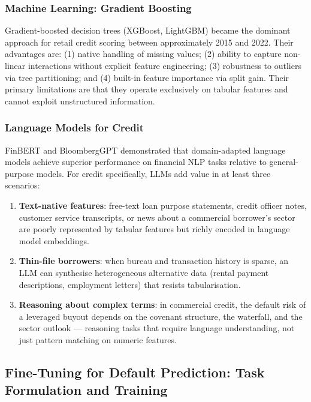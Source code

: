 \begin{context}
\subsubsection*{Machine Learning: Gradient Boosting}

Gradient-boosted decision trees (XGBoost, LightGBM) became the dominant approach for retail credit scoring between approximately 2015 and 2022. Their advantages are: (1) native handling of missing values; (2) ability to capture non-linear interactions without explicit feature engineering; (3) robustness to outliers via tree partitioning; and (4) built-in feature importance via split gain. Their primary limitations are that they operate exclusively on tabular features and cannot exploit unstructured information.

\subsubsection*{Language Models for Credit}

FinBERT \cite{yang2020finbert} and BloombergGPT \cite{wu2023bloomberggpt} demonstrated that domain-adapted language models achieve superior performance on financial NLP tasks relative to general-purpose models. For credit specifically, LLMs add value in at least three scenarios:

\begin{enumerate}
  \item \textbf{Text-native features}: free-text loan purpose statements, credit officer notes, customer service transcripts, or news about a commercial borrower's sector are poorly represented by tabular features but richly encoded in language model embeddings.
  \item \textbf{Thin-file borrowers}: when bureau and transaction history is sparse, an LLM can synthesise heterogeneous alternative data (rental payment descriptions, employment letters) that resists tabularisation.
  \item \textbf{Reasoning about complex terms}: in commercial credit, the default risk of a leveraged buyout depends on the covenant structure, the waterfall, and the sector outlook --- reasoning tasks that require language understanding, not just pattern matching on numeric features.
\end{enumerate}

\subsection{Fine-Tuning for Default Prediction: Task Formulation and Training}
\label{subsec:credit-finetuning}


\end{context}
